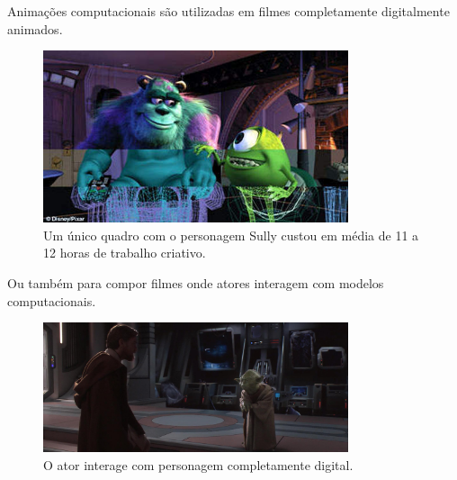 \documentclass[brazil]{beamer}
\begin{document}
\begin{frame}
  Animações computacionais são utilizadas em filmes completamente digitalmente
  animados.
      \begin{figure}
        \centering
        \includegraphics[width = 0.8\textwidth, keepaspectratio]{./img/sully.jpg}
        \caption{Um único quadro com o personagem Sully custou em média de 11 a 12 horas de trabalho criativo.}
      \end{figure}
\end{frame}

\begin{frame}
  Ou também para compor filmes onde atores interagem com modelos computacionais.
      \begin{figure}
        \centering
        \includegraphics[width = 0.8\textwidth, keepaspectratio]{./img/actorAndAnimation.jpg}
        \caption{O ator interage com personagem completamente digital.}
      \end{figure}
\end{frame}
\end{document}
